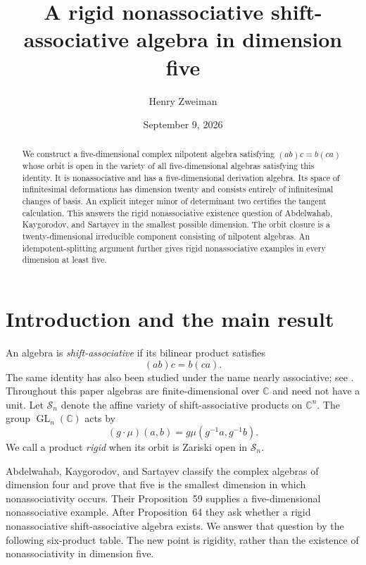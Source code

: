 \documentclass[11pt]{article}
\title{A rigid nonassociative shift-associative algebra in dimension five}
\author{Henry Zweiman}
\date{September 9, 2026}
\theoremstyle{remark}
\newcommand{\C}{\mathbb C}
\newcommand{\SAs}{\mathcal S}
\newcommand{\GL}{\operatorname{GL}}
\begin{document}
\maketitle
\begin{abstract}
We construct a five-dimensional complex nilpotent algebra satisfying $(ab)c=b(ca)$ whose orbit is open in the variety of all five-dimensional algebras satisfying this identity. It is nonassociative and has a five-dimensional derivation algebra. Its space of infinitesimal deformations has dimension twenty and consists entirely of infinitesimal changes of basis. An explicit integer minor of determinant two certifies the tangent calculation. This answers the rigid nonassociative existence question of Abdelwahab, Kaygorodov, and Sartayev in the smallest possible dimension. The orbit closure is a twenty-dimensional irreducible component consisting of nilpotent algebras. An idempotent-splitting argument further gives rigid nonassociative examples in every dimension at least five.
\end{abstract}

\section{Introduction and the main result}
An algebra is \emph{shift-associative} if its bilinear product satisfies
\begin{equation}\label{eq:shift}
 (ab)c=b(ca).
\end{equation}
The same identity has also been studied under the name nearly associative; see \cite{BBR}. Throughout this paper algebras are finite-dimensional over $\C$ and need not have a unit. Let $\SAs_n$ denote the affine variety of shift-associative products on $\C^n$. The group $\GL_n(\C)$ acts by
\[
 (g\cdot\mu)(a,b)=g\mu(g^{-1}a,g^{-1}b).
\]
We call a product \emph{rigid} when its orbit is Zariski open in $\SAs_n$.

Abdelwahab, Kaygorodov, and Sartayev \cite{AKS} classify the complex algebras of dimension four and prove that five is the smallest dimension in which nonassociativity occurs. Their Proposition~59 supplies a five-dimensional nonassociative example. After Proposition~64 they ask whether a rigid nonassociative shift-associative algebra exists. We answer that question by the following six-product table. The new point is rigidity, rather than the existence of nonassociativity in dimension five.
\end{document}
